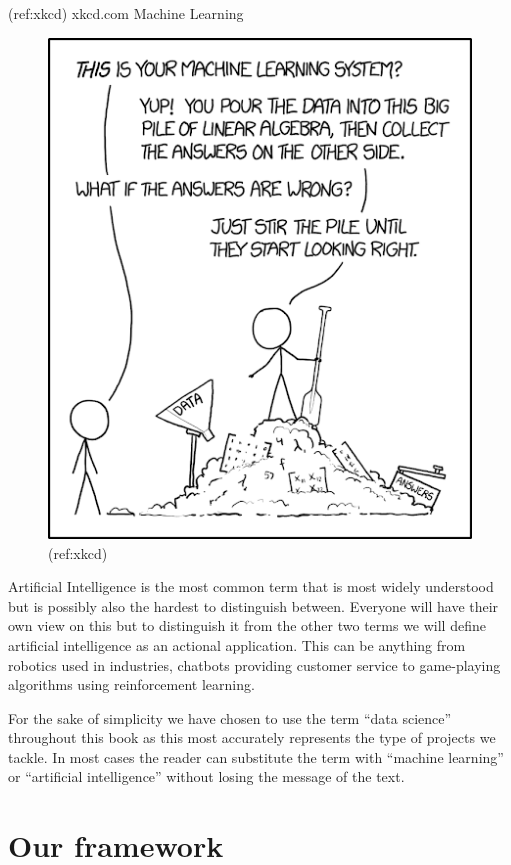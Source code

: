 \documentclass[
]{book}
\begin{document}
(ref:xkcd) xkcd.com Machine Learning

\begin{center}

\begin{figure}
\includegraphics[width=0.5\linewidth]{figures/xkcd} \caption{(ref:xkcd)}\label{fig:xkcd-fig}
\end{figure}

\end{center}

Artificial Intelligence is the most common term that is most widely
understood but is possibly also the hardest to distinguish between.
Everyone will have their own view on this but to distinguish it from the
other two terms we will define artificial intelligence as an actional
application. This can be anything from robotics used in industries,
chatbots providing customer service to game-playing algorithms using
reinforcement learning.

For the sake of simplicity we have chosen to use the term ``data
science'' throughout this book as this most accurately represents the
type of projects we tackle. In most cases the reader can substitute the
term with ``machine learning'' or ``artificial intelligence'' without
losing the message of the text.

\hypertarget{our-framework}{%
\section{Our framework}\label{our-framework}}
\end{document}
